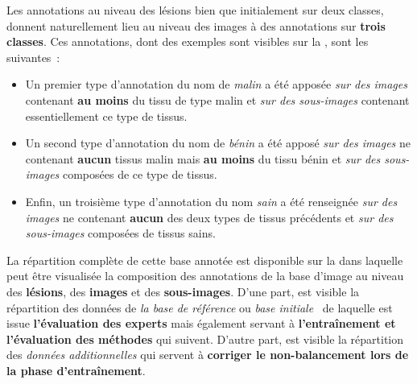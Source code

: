 Les annotations au niveau des lésions bien que initialement sur deux classes, donnent naturellement lieu au niveau des images à des annotations sur \textbf{trois classes}. Ces annotations, dont des exemples sont visibles sur la , sont les suivantes~:
\begin{itemize}
    \item Un premier type d'annotation du nom de \textit{malin} a été apposée \textit{sur des images} contenant \textbf{au moins} du tissu de type malin et \textit{sur des sous-images} contenant essentiellement ce type de tissus. 
    \item Un second type d'annotation du nom de \textit{bénin} a été apposé \textit{sur des images} ne contenant \textbf{aucun} tissus malin mais \textbf{au moins} du tissu bénin et \textit{sur des sous-images} composées de ce type de tissus. 
    \item  Enfin, un troisième type d'annotation du nom \textit{sain} a été renseignée \textit{sur des images} ne contenant \textbf{aucun} des deux types de tissus précédents et \textit{sur des sous-images} composées de tissus sains. 
\end{itemize}\par

La répartition complète de cette base annotée est disponible sur la  dans laquelle peut être visualisée la composition des annotations de la base d'image au niveau des \textbf{lésions}, des \textbf{images} et des \textbf{sous-images}. D'une part, est visible la répartition des données de \textit{la base de référence} ou \textit{base initiale}~\cite{Cinotti2018} de laquelle est issue \textbf{l'évaluation des experts} mais également servant à \textbf{l'entraînement et l'évaluation des méthodes} qui suivent. D'autre part, est visible la répartition des \textit{données additionnelles} qui servent à \textbf{corriger le non-balancement lors de la phase d'entraînement}.\par

